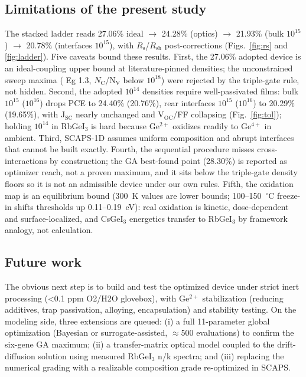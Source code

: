\documentclass[aip,jap,amsmath,amssymb,preprint]{revtex4-2}
\begin{document}
\subsection{Limitations of the present study}
The stacked ladder reads 27.06\% ideal $\rightarrow$ 24.28\% (optics) $\rightarrow$ 21.93\% (bulk $10^{15}$) $\rightarrow$ 20.78\% (interfaces $10^{15}$), with $R_{\mathrm{s}}$/$R_{\mathrm{sh}}$ post-corrections (Figs.~\ref{fig:rs} and \ref{fig:ladder}).
Five caveats bound these results. First, the 27.06\% adopted device is an ideal-coupling upper bound at literature-pinned densities; the unconstrained sweep maxima ( Eg 1.3, $N_{\mathrm{C}}$/N$_{\mathrm{V}}$ below $10^{18}$) were rejected by the triple-gate rule, not hidden. Second, the adopted $10^{14}$ densities require well-passivated films: bulk $10^{15}$ ($10^{16}$) drops PCE to 24.40\% (20.76\%), rear interfaces $10^{15}$ ($10^{16}$) to 20.29\% (19.65\%), with J$_{\mathrm{SC}}$ nearly unchanged and V$_{\mathrm{OC}}$/FF collapsing (Fig.~\ref{fig:tol}); holding $10^{14}$ in RbGeI$_{3}$ is hard because Ge$^{2+}$ oxidizes readily to Ge$^{4+}$ in ambient. Third, SCAPS-1D assumes uniform composition and abrupt interfaces that cannot be built exactly. Fourth, the sequential procedure misses cross-interactions by construction; the GA best-found point (28.30\%) is reported as optimizer reach, not a proven maximum, and it sits below the triple-gate density floors so it is not an admissible device under our own rules. Fifth, the oxidation map is an equilibrium bound (300~K values are lower bounds; 100--150~$^{\circ}$C freeze-in shifts thresholds up 0.11--0.19~eV): real oxidation is kinetic, dose-dependent and surface-localized, and CsGeI$_{3}$ energetics transfer to RbGeI$_{3}$ by framework analogy, not calculation.

\subsection{Future work}
The obvious next step is to build and test the optimized device under strict inert processing (<0.1 ppm O2/H2O glovebox), with Ge$^{2+}$ stabilization (reducing additives, trap passivation, alloying, encapsulation) and stability testing. On the modeling side, three extensions are queued: (i) a full 11-parameter global optimization (Bayesian or surrogate-assisted, $\approx$500 evaluations) to confirm the six-gene GA maximum; (ii) a transfer-matrix optical model coupled to the drift-diffusion solution using measured RbGeI$_{3}$ n/k spectra; and (iii) replacing the numerical grading with a realizable composition grade re-optimized in SCAPS.
\end{document}
